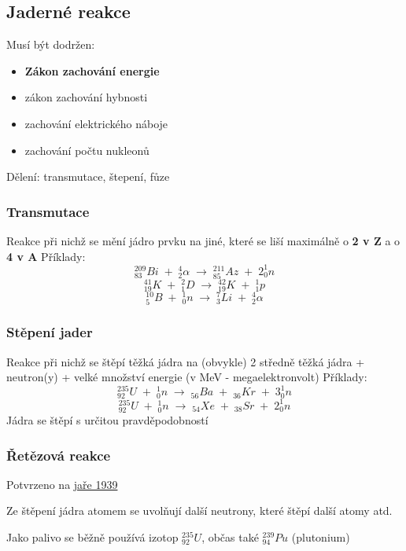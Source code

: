\subsection{Jaderné reakce}
Musí být dodržen:
\begin{itemize}
    \item \textbf{Zákon zachování energie}
    \item zákon zachování hybnosti
    \item zachování elektrického náboje
    \item zachování počtu nukleonů
\end{itemize}

Dělení: transmutace, štepení, fůze

\subsubsection{Transmutace}
Reakce při nichž se mění jádro prvku na jiné, které se liší maximálně o \textbf{2 v Z} a o \textbf{4 v A}
Příklady:
\[^{209}_{83}Bi \; + \; ^4_2\alpha \; \longrightarrow \; ^{211}_{85}Az \; + \; 2^1_0n\]
\vspace{0.2em}
\[^{41}_{19}K \; + \; ^2_1D \; \longrightarrow \; ^{42}_{19}K \; + \; ^1_1p\]
\vspace{0.2em}
\[^{10}_{5}B \; + \; ^1_0n \; \longrightarrow \; ^{7}_{3}Li \; + \; ^4_2\alpha\]

\subsubsection{Stěpení jader}
Reakce při nichž se štěpí těžká jádra na (obvykle) 2 středně těžká jádra + neutron(y) + velké množství energie (v MeV - megaelektronvolt)
Příklady:
\[^{235}_{92}U \; + \; ^1_0n \; \longrightarrow \; _{56}Ba \; + \; _{36}Kr \; + \; 3^1_0n\]
\vspace{0.1em}
\[^{235}_{92}U \; + \; ^1_0n \; \longrightarrow \; _{54}Xe \; + \; _{38}Sr \; + \; 2^1_0n\]
Jádra se štěpí s určitou pravděpodobností

\subsubsection{Řetězová reakce}
Potvrzeno na \underline{jaře 1939}

Ze štěpení jádra atomem se uvolňují další neutrony, které štěpí další atomy atd.

Jako palivo se běžně používá izotop $^{235}_{92}U$, občas také $^{239}_{94}Pu$ (plutonium)

